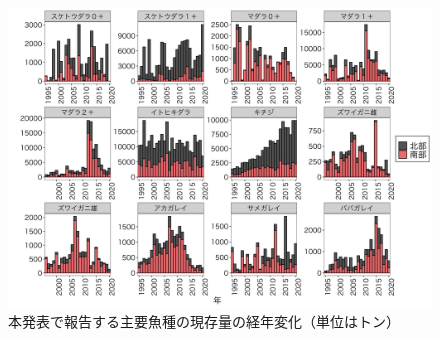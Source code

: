 \documentclass[12pt]{article}
\begin{document}
\begin{figure}[h]
  \centering
  \includegraphics[width = 18cm]{trendabst.png}
  \caption{本発表で報告する主要魚種の現存量の経年変化（単位はトン）}
\end{figure}
\end{document}
